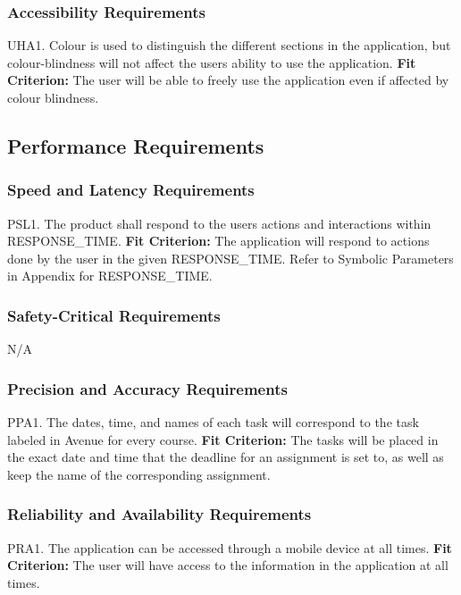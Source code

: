 \documentclass[12pt, titlepage]{article}
\begin{document}
\subsubsection{Accessibility Requirements}

UHA1. Colour is used to distinguish the different sections in the application, but colour-blindness will not affect the users ability to use the application.
	\textbf{Fit Criterion:} The user will be able to freely use the application even if affected by 
colour blindness.

\subsection{Performance Requirements}

\subsubsection{Speed and Latency Requirements}

PSL1. The product shall respond to the users actions and interactions within RESPONSE\_TIME.
	\textbf{Fit Criterion:} The application will respond to actions done by the user in the given 
RESPONSE\_TIME. Refer to Symbolic Parameters in Appendix for RESPONSE\_TIME.

\subsubsection{Safety-Critical Requirements}

N/A

\subsubsection{Precision and Accuracy Requirements}

PPA1. The dates, time, and names of each task will correspond to the task labeled in Avenue for every course.
	\textbf{Fit Criterion:} The tasks will be placed in the exact date and time that the deadline for an 
assignment is set to, as well as keep the name of the corresponding assignment.

\subsubsection{Reliability and Availability Requirements}

PRA1. The application can be accessed through a mobile device at all times.
	\textbf{Fit Criterion:} The user will have access to the information in the application at all times.\\
\end{document}
